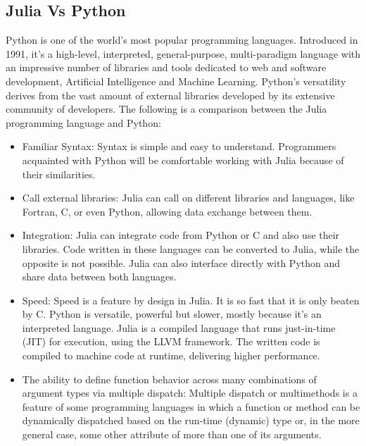 \documentclass{article}
\begin{document}
\subsection{Julia Vs Python }
Python is one of the world's most popular programming languages. Introduced in 1991, it's a high-level, interpreted, general-purpose, multi-paradigm language with an impressive number of libraries and tools dedicated to web and software development, Artificial Intelligence and Machine Learning.
Python's versatility derives from the vast amount of external libraries developed by its extensive community of developers.
The following is a comparison between the Julia programming language and Python:
\begin{itemize}
 \setlength\itemsep{-0.3em}
\item Familiar Syntax: Syntax is simple and easy to understand. Programmers acquainted with Python will be comfortable working with Julia because of their similarities.
\item Call external libraries: Julia can call on different libraries and languages, like Fortran, C, or even Python, allowing data exchange between them.
\item Integration:
Julia can integrate code from Python or C and also use their libraries. Code written in these languages can be converted to Julia, while the opposite is not possible. Julia can also interface directly with Python and share data between both languages.
\item Speed:
Speed is a feature by design in Julia. It is so fast that it is only beaten by C. Python is versatile, powerful but slower, mostly because it's an interpreted language.
Julia is a compiled language that runs just-in-time (JIT) for execution, using the LLVM framework. The written code is compiled to machine code at runtime, delivering higher performance.
\item The ability to define function behavior across many combinations of argument types via multiple dispatch:
Multiple dispatch or multimethods is a feature of some programming languages in which a function or method can be dynamically dispatched based on the run-time (dynamic) type or, in the more general case, some other attribute of more than one of its arguments.
 \end{itemize}
\end{document}

